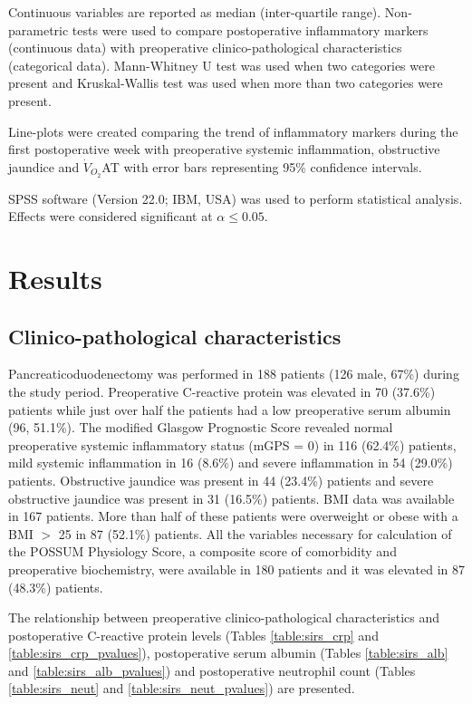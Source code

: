 Continuous variables are reported as median (inter-quartile range).
Non-parametric tests were used to compare postoperative inflammatory markers (continuous data) with preoperative clinico-pathological characteristics (categorical data). 
Mann-Whitney U test was used when two categories were present and Kruskal-Wallis test was used when more than two categories were present.

Line-plots were created comparing the trend of inflammatory markers during the first postoperative week with preoperative systemic inflammation, obstructive jaundice and $\dot{V}_{O_2}$AT with error bars representing 95\% confidence intervals. 

SPSS software (Version 22.0; IBM, USA) was used to perform statistical analysis. 
Effects were considered significant at $\alpha \leq0.05$. 

\clearpage
\section{Results}

\subsection{Clinico-pathological characteristics}

Pancreaticoduodenectomy was performed in 188 patients (126 male, 67\%) during the study period.
Preoperative C-reactive protein was elevated in 70 (37.6\%) patients while just over half the patients had a low preoperative serum albumin (96, 51.1\%). 
The modified Glasgow Prognostic Score revealed normal preoperative systemic inflammatory status (mGPS = 0) in 116 (62.4\%) patients, mild systemic inflammation in 16 (8.6\%) and severe inflammation in 54 (29.0\%) patients. 
Obstructive jaundice was present in 44 (23.4\%) patients and severe obstructive jaundice was present in 31 (16.5\%) patients. 
BMI data was available in 167 patients. 
More than half of these patients were overweight or obese with a BMI $>$ 25 in 87 (52.1\%) patients.
All the variables necessary for calculation of the POSSUM Physiology Score, a composite score of comorbidity and preoperative biochemistry, were available in 180 patients and it was elevated in 87 (48.3\%) patients.

The relationship between preoperative clinico-pathological characteristics and postoperative C-reactive protein levels (Tables \ref{table:sirs_crp} and \ref{table:sirs_crp_pvalues}), postoperative serum albumin (Tables \ref{table:sirs_alb} and \ref{table:sirs_alb_pvalues}) and postoperative neutrophil count (Tables \ref{table:sirs_neut} and \ref{table:sirs_neut_pvalues}) are presented.

